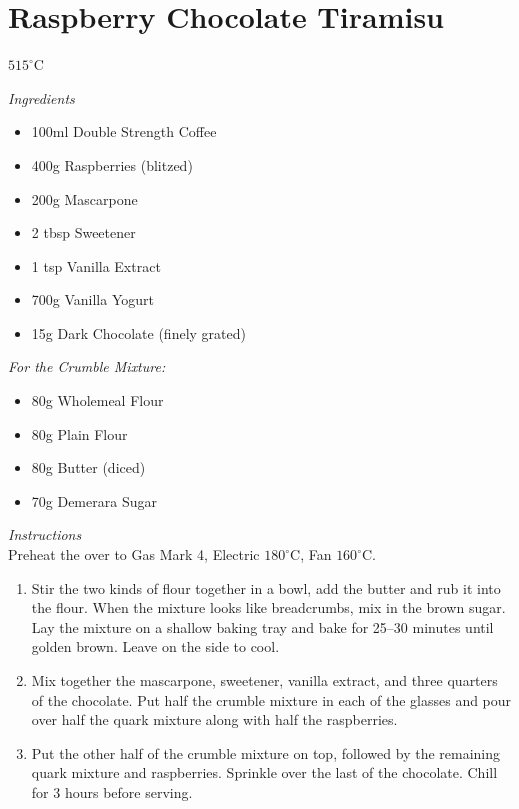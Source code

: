 \documentclass{article}
\newcommand{\recipe}[1]{\newpage\lhead{}\chead{}\rhead{}\lfoot{}\rfoot{}\section*{#1}}
\newcommand{\serves}[1]{\chead{Serves #1}}
\newcommand{\vegetarian}{\rhead{V}}
\newcommand{\ingredients}[1][\Large\emph{Ingredients}]{\emph{#1}\\}
\newcommand{\instructions}[1][\Large\emph{Instructions}]{\emph{#1}\\}
\newcommand{\temp}[1]{$#1^\circ$C}
\begin{document}
\recipe{Raspberry Chocolate Tiramisu}
\serves{4}
\vegetarian
\temp{515}


\begin{multicols}{2}
\ingredients
\begin{itemize}
    \item 100ml Double Strength Coffee
    \item 400g Raspberries (blitzed)
    \item 200g Mascarpone
    \item 2 tbsp Sweetener
    \item 1 tsp Vanilla Extract
    \item 700g Vanilla Yogurt
    \item 15g Dark Chocolate (finely grated)
\end{itemize}
\columnbreak
\ingredients[For the Crumble Mixture:]
\begin{itemize}
    \item 80g Wholemeal Flour
    \item 80g Plain Flour
    \item 80g Butter (diced)
    \item 70g Demerara Sugar
\end{itemize}
\end{multicols}

\instructions
Preheat the over to Gas Mark 4, Electric \temp{180}, Fan \temp{160}.
\begin{enumerate}
    \item Stir the two kinds of flour together in a bowl, add the butter and rub it into the flour. When the mixture looks like breadcrumbs, mix in the brown sugar. Lay the mixture on a shallow baking tray and bake for 25--30 minutes until golden brown. Leave on the side to cool.
    \item Mix together the mascarpone, sweetener, vanilla extract, and three quarters of the chocolate. Put half the crumble mixture in each of the glasses and pour over half the quark mixture along with half the raspberries.
    \item Put the other half of the crumble mixture on top, followed by the remaining quark mixture and raspberries. Sprinkle over the last of the chocolate. Chill for 3 hours before serving.
\end{enumerate}
\end{document}
